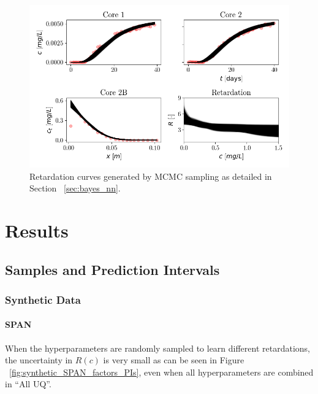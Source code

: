 \begin{figure}[h]
    \centering
    \includegraphics{figs/finn_mcmc_samples.png}
    \caption{Retardation curves generated by MCMC sampling as detailed in Section ~\vref{sec:bayes_nn}.}
    \label{fig:mcmc_samples}
\end{figure}





\section{Results}
\subsection{Samples and Prediction Intervals}
\subsubsection{Synthetic Data}

\paragraph{SPAN}
When the hyperparameters are randomly sampled to learn different retardations, the uncertainty in $R(c)$ is very small as can be seen in Figure ~\vref{fig:synthetic_SPAN_factors_PIs}, even when all hyperparameters are combined in ``All UQ''.

